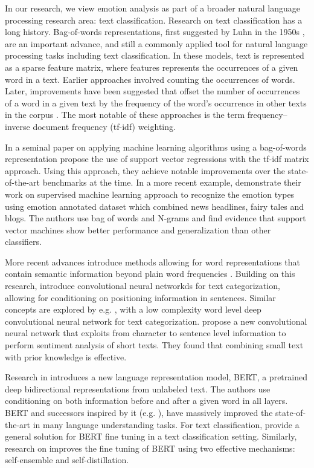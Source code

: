 \documentclass[conference]{IEEEtran}
\begin{document}
In our research, we view emotion analysis as part of a broader natural language processing research area: text classification. Research on text classification has a long history. Bag-of-words representations, first suggested by Luhn in the 1950s \cite{luhn}, are an important advance, and still a commonly applied tool for natural language processing tasks including text classification. In these models, text is represented as a sparse feature matrix, where features represents the occurrences of a given word in a text. Earlier approaches involved counting the occurrences of words. Later, improvements have been suggested that offset the number of occurrences of a word in a given text by the frequency of the word's occurrence in other texts in the corpus \cite{tfidf}. The most notable of these approaches is the term frequency–inverse document frequency (tf-idf) weighting.

In a seminal paper on applying machine learning algorithms using a bag-of-words representation \cite{joachims-svm} propose the use of support vector regressions with the tf-idf matrix approach. Using this approach, they achieve notable improvements over the state-of-the-art benchmarks at the time. In a more recent example, \cite{chaffaretal}  demonstrate their work on supervised machine learning approach to recognize the emotion types using emotion annotated dataset which combined news headlines, fairy tales and blogs. The authors use bag of words and N-grams and find evidence that support vector machines show better performance and generalization than other classifiers. 

More recent advances introduce methods allowing for word representations that contain semantic information beyond plain word frequencies \cite{mikolov2013distributed, mikolov2013efficient, bojanowski2016enriching, joulin2016bag}. Building on this research, \cite{kim-2014-convolutional} introduce convolutional neural networkds for text categorization, allowing for conditioning on positioning information in sentences. Similar concepts are explored by e.g. \cite{johnsonetal}, with a low complexity word level deep convolutional neural network for text categorization. \cite{dossantosetal} propose a new convolutional neural network that exploits from character to sentence level information to perform sentiment analysis of short texts. They found that combining small text with prior knowledge is effective.

Research in \cite{bert} introduces a new language representation model, BERT, a pretrained deep bidirectional representations from unlabeled text. The authors use conditioning on both information before and after a given word in all layers. BERT and successors inspired by it (e.g. \cite{xlnet}), have massively improved the state-of-the-art in many language understanding tasks. For text classification, \cite{ bertclassification} provide a general solution for BERT fine tuning in a text classification setting. Similarly, research on \cite{xu2020improving} improves the fine tuning of BERT using two effective mechanisms: self-ensemble and self-distillation.
\end{document}
